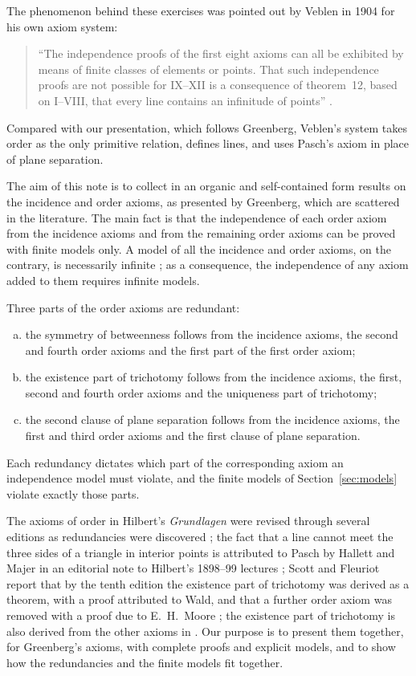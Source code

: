 \documentclass[11pt]{amsart}
\theoremstyle{definition}
\theoremstyle{remark}
\begin{document}
The phenomenon behind these exercises was pointed out by Veblen in 1904 for his own axiom system:
\begin{quote}
``The independence proofs of the first eight axioms can all be exhibited by means of finite classes of elements or points. That such independence proofs are not possible for IX--XII is a consequence of theorem~12, based on I--VIII, that every line contains an infinitude of points'' \cite[\S7]{Veb}.
\end{quote}
Compared with our presentation, which follows Greenberg, Veblen's system takes order as the only primitive relation, defines lines, and uses Pasch's axiom in place of plane separation.

The aim of this note is to collect in an organic and self-contained form results on the incidence and order axioms, as presented by Greenberg, which are scattered in the literature. The main fact is that the independence of each order axiom from the incidence axioms and from the remaining order axioms can be proved with finite models only. A model of all the incidence and order axioms, on the contrary, is necessarily infinite \cite[Exercise~7.4]{Har}; as a consequence, the independence of any axiom added to them requires infinite models.

Three parts of the order axioms are redundant:
\begin{enumerate}[(a)]
\item the symmetry of betweenness follows from the incidence axioms, the second and fourth order axioms and the first part of the first order axiom;
\item the existence part of trichotomy follows from the incidence axioms, the first, second and fourth order axioms and the uniqueness part of trichotomy;
\item the second clause of plane separation follows from the incidence axioms, the first and third order axioms and the first clause of plane separation.
\end{enumerate}
Each redundancy dictates which part of the corresponding axiom an independence model must violate, and the finite models of Section~\ref{sec:models} violate exactly those parts.

The axioms of order in Hilbert's \emph{Grundlagen} were revised through several editions as redundancies were discovered \cite{SF,BSV}; the fact that a line cannot meet the three sides of a triangle in interior points is attributed to Pasch by Hallett and Majer in an editorial note to Hilbert's 1898--99 lectures \cite[Chapter~4, note~36]{HM};  Scott and Fleuriot report that by the tenth edition the existence part of trichotomy was derived as a theorem, with a proof attributed to Wald, and that a further order axiom was removed with a proof due to E.~H.~Moore \cite{SF}; the existence part of trichotomy is also derived from the other axioms in \cite[Theorem~8]{BSV}.
Our purpose is to present them together, for Greenberg's axioms, with complete proofs and explicit models, and to show how the redundancies and the finite models fit together.
\end{document}
